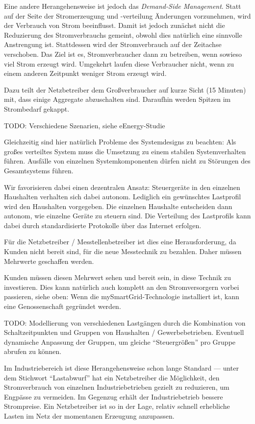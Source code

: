 \documentclass[12pt,BCOR=8.5mm]{scrartcl}
\begin{document}
Eine andere Herangehensweise ist jedoch das \emph{Demand-Side
Management}. Statt auf der Seite der Stromerzeugung und -verteilung
Änderungen vorzunehmen, wird der Verbrauch von Strom beeinflusst. Damit
ist jedoch zunächst nicht die Reduzierung des Stromverbrauchs gemeint,
obwohl dies natürlich eine sinnvolle Anstrengung ist. Stattdessen wird
der Stromverbrauch auf der Zeitachse verschoben. Das Ziel ist es,
Stromverbraucher dann zu betreiben, wenn sowieso viel Strom erzeugt
wird. Umgekehrt laufen diese Verbraucher nicht, wenn zu einem anderen
Zeitpunkt weniger Strom erzeugt wird.


Dazu teilt der Netzbetreiber dem Großverbraucher auf kurze Sicht (15
Minuten) mit, dass einige Aggregate abzuschalten sind. Daraufhin werden
Spitzen im Strombedarf gekappt.

TODO: Verschiedene Szenarien, siehe eEnergy-Studie

Gleichzeitig sind hier natürlich Probleme des Systemdesigns zu beachten:
Als großes verteiltes System muss die Umsetzung zu einem stabilen
Systemverhalten führen. Ausfälle von einzelnen Systemkomponenten dürfen
nicht zu Störungen des Gesamtsystems führen.

Wir favorisieren dabei einen dezentralen Ansatz: Steuergeräte in den
einzelnen Haushalten verhalten sich dabei autonom. Lediglich ein
gewünschtes Lastprofil wird den Haushalten vorgegeben. Die einzelnen
Haushalte entscheiden dann autonom, wie einzelne Geräte zu steuern sind.
Die Verteilung des Lastprofils kann dabei durch standardisierte
Protokolle über das Internet erfolgen.


Für die Netzbetreiber / Messtellenbetreiber ist dies eine
Herausforderung, da Kunden nicht bereit sind, für die neue Messtechnik
zu bezahlen. Daher müssen Mehrwerte geschaffen werden.

Kunden müssen diesen Mehrwert sehen und bereit sein, in diese Technik zu
investieren. Dies kann natürlich auch komplett an den Stromversorgern
vorbei passieren, siehe oben: Wenn die mySmartGrid-Technologie
installiert ist, kann eine Genossenschaft gegründet werden.

TODO: Modellierung von verschiedenen Lastgängen durch die Kombination
von Schaltzeitpunkten und Gruppen von Haushalten / Gewerbebetrieben.
Eventuell dynamische Anpassung der Gruppen, um gleiche ``Steuergrößen''
pro Gruppe abrufen zu können. 


Im Industriebereich ist diese Herangehensweise schon lange Standard ---
unter dem Stichwort "`Lastabwurf"' hat ein Netzbetreiber die
Möglichkeit, den Stromverbrauch von einzelnen Industriebetrieben gezielt
zu reduzieren, um Engpässe zu vermeiden. Im Gegenzug erhält der
Industriebetrieb bessere Strompreise. Ein Netzbetreiber ist so in der
Lage, relativ schnell erhebliche Lasten im Netz der momentanen Erzeugung
anzupassen.
\end{document}
